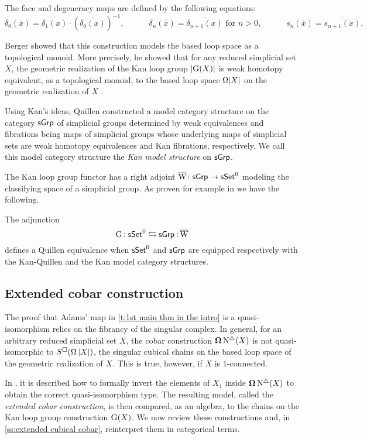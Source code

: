 The face and degeneracy maps are defined by the following equations:
\[
\delta_0(\overline{x}) = \overline{\delta_1(x)} \cdot (\overline{\delta_0(x)})^{-1}, \qquad \quad
\delta_n(\overline{x}) = \overline{\delta_{n+1}(x)} \text{ for } n>0, \qquad \quad
s_n(\overline{x}) = \overline{s_{n+1}(x)}.
\]

Berger showed that this construction models the based loop space as a topological monoid.
More precisely, he showed that for any reduced simplicial set $X$, the geometric realization of the Kan loop group $\lvert\operatorname{G}(X)\rvert$ is weak homotopy equivalent, as a topological monoid, to the based loop space $\operatorname{\Omega} \lvert X\rvert$ on the geometric realization of $X$ \cite{berger1995loops}.

Using Kan's ideas, Quillen constructed a model category structure on the category $\mathsf{sGrp}$ of simplicial groups determined by
weak equivalences and fibrations being maps of simplicial groups whose underlying maps of simplicial sets are weak homotopy equivalences and Kan fibrations, respectively.
We call this model category structure the \textit{Kan model structure} on $\mathsf{sGrp}$.

The Kan loop group functor has a right adjoint $\operatorname{\overline{W}} \colon \mathsf{sGrp} \to \mathsf{sSet}^0$ modeling the classifying space of a simplicial group.
As proven for example in \cite[Chapter V]{goerss2009simplicial} we have the following.

\begin{proposition} \label{p:kan adjuntion}
	The adjunction
	\[
	\operatorname{G} \colon \mathsf{sSet}^0 \leftrightarrows \mathsf{sGrp} :\! \operatorname{\overline{W}}
	\]
	defines a Quillen equivalence when $\mathsf{sSet}^0$ and $\mathsf{sGrp}$ are equipped respectively with the Kan-Quillen and the Kan model category structures.
\end{proposition}

\subsection{Extended cobar construction}

The proof that Adams' map in \cref{t:1st main thm in the intro} is a quasi-isomorphism relies on the fibrancy of the singular complex.
In general, for an arbitrary reduced simplicial set $X$, the cobar construction $\operatorname{\mathbf{\Omega}} \operatorname{N^{\triangle}}(X)$ is not quasi-isomorphic to $S^{\square}(\operatorname{\Omega}|X|)$, the singular cubical chains on the based loop space of the geometric realization of $X$.
This is true, however, if $X$ is $1$-connected.

In \cite{hess2010cobar}, it is described how to formally invert the elements of $X_1$ inside $\operatorname{\mathbf{\Omega}} \operatorname{N^{\triangle}}(X)$ to obtain the correct quasi-isomorphism type.
The resulting model, called the \textit{extended cobar construction}, is then compared, as an algebra, to the chains on the Kan loop group construction $\operatorname{G}(X)$.
We now review these constructions and, in \cref{ss:extended cubical cobar}, reinterpret them in categorical terms.

